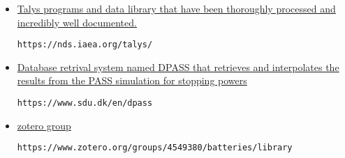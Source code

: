 \documentclass[12pt]{article}
\begin{document}
\begin{itemize}
\item \href{https://nds.iaea.org/talys/
}{Talys programs and data library that have been thoroughly processed and incredibly well documented.}
\begin{lstlisting}[breaklines]
https://nds.iaea.org/talys/
\end{lstlisting}


\item \href{https://www.sdu.dk/en/dpass
}{Database retrival system named DPASS that retrieves and interpolates the results from the PASS simulation for stopping powers}
\begin{lstlisting}[breaklines]
https://www.sdu.dk/en/dpass
\end{lstlisting}

\item \href{https://www.zotero.org/groups/4549380/batteries/library
}{zotero group}
\begin{lstlisting}[breaklines]
https://www.zotero.org/groups/4549380/batteries/library
\end{lstlisting}

\end{itemize}
\end{document}
